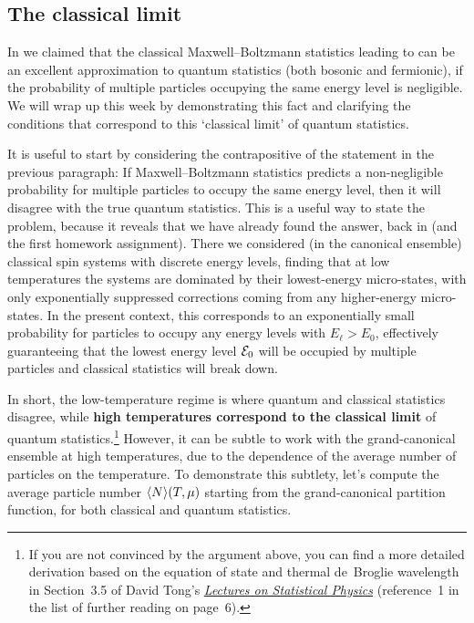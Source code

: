 \subsection{The classical limit}
In  we claimed that the classical Maxwell--Boltzmann statistics leading to  can be an excellent approximation to quantum statistics (both bosonic and fermionic), if the probability of multiple particles occupying the same energy level is negligible.
We will wrap up this week by demonstrating this fact and clarifying the conditions that correspond to this `classical limit' of quantum statistics.

It is useful to start by considering the contrapositive of the statement in the previous paragraph:
If Maxwell--Boltzmann statistics predicts a non-negligible probability for multiple particles to occupy the same energy level, then it will disagree with the true quantum statistics.
This is a useful way to state the problem, because it reveals that we have already found the answer, back in  (and the first homework assignment).
There we considered (in the canonical ensemble) classical spin systems with discrete energy levels, finding that at low temperatures the systems are dominated by their lowest-energy micro-states, with only exponentially suppressed corrections coming from any higher-energy micro-states.
In the present context, this corresponds to an exponentially small probability for particles to occupy any energy levels with $E_{\ell} > E_0$, effectively guaranteeing that the lowest energy level $\mathcal E_0$ will be occupied by multiple particles and classical statistics will break down.

In short, the low-temperature regime is where quantum and classical statistics disagree, while \textbf{high temperatures correspond to the classical limit} of quantum statistics.\footnote{If you are not convinced by the argument above, you can find a more detailed derivation based on the equation of state and thermal de~Broglie wavelength in Section~3.5 of David Tong's \href{https://www.damtp.cam.ac.uk/user/tong/statphys.html}{\textit{Lectures on Statistical Physics}} (reference~1 in the list of further reading on page~6).}
However, it can be subtle to work with the grand-canonical ensemble at high temperatures, due to the dependence of the average number of particles on the temperature.
To demonstrate this subtlety, let's compute the average particle number $\left\langle N \right\rangle\!(T, \mu)$ starting from the grand-canonical partition function, for both classical and quantum statistics.

